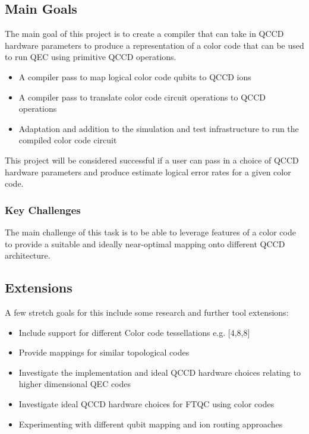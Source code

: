 \subsection{Main Goals}
The main goal of this project is to create a compiler that can take in QCCD hardware parameters to produce a representation of a color code that can be used to run QEC using primitive QCCD operations.
\newline
{}
\begin{itemize}
    \item A compiler pass to map logical color code qubits to QCCD ions
    \item A compiler pass to translate color code circuit operations to QCCD operations
    \item Adaptation and addition to the simulation and test infrastructure to run the compiled color code circuit
\end{itemize}

This project will be considered successful if a user can pass in a choice of QCCD hardware parameters and produce estimate logical error rates for a given color code.

\subsubsection{Key Challenges}
The main challenge of this task is to be able to leverage features of a color code to provide a suitable and ideally near-optimal mapping onto different QCCD architecture.

\subsection{Extensions}
A few stretch goals for this include some research and further tool extensions:

\begin{itemize}
    \item Include support for different Color code tessellations e.g. [4,8,8]
    \item Provide mappings for similar topological codes
    \item Investigate the implementation and ideal QCCD hardware choices relating to higher dimensional QEC codes
    \item Investigate ideal QCCD hardware choices for FTQC using color codes
    \item Experimenting with different qubit mapping and ion routing approaches
\end{itemize}

